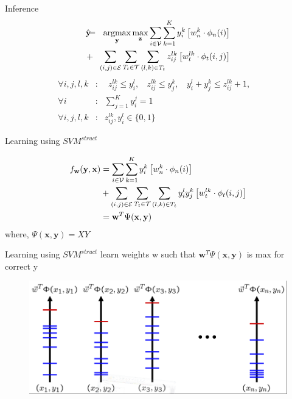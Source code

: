 \documentclass{beamer}
\DeclareMathOperator*{\argmax}{argmax}
\newcommand{\x}{{\mathbf x}}     %
\newcommand{\y}{{\mathbf y}}     %
\newcommand{\ysc}[2]{{y_{#1}^{#2}}}    %
\newcommand{\zsc}[2]{{z_{#1}^{#2}}}    %
\newcommand{\fn}[1]{{\phi_n(#1)}}      %
\newcommand{\fe}[3]{{\phi_{#1}(#2,#3)}}%
\newcommand{\w}{{\mathbf w}}           %
\newcommand{\wn}[1]{{w_n^{#1}}}        %
\newcommand{\we}[3]{{w_{#1}^{#2#3}}}   %
\newcommand{\df}[3]{{f_{#3}(#1,#2)}}   %
\begin{document}
\begin{frame}{Inference}
 \begin{eqnarray*}
\hat{\y}\!\!\!&=&\!\!\!\argmax_{\y}\max_{\mathbf z} \sum_{i \in \mathcal{V}} \sum_{k=1}^{K} \ysc{i}{k} \left[\wn{k} \cdot \fn{i} \right] \\
&+&  \!\!\!\sum_{(i,j)\in \mathcal{E}}  \sum_{T_t \in {\cal T}} \sum_{(l,k)\in T_t} \zsc{ij}{lk} \left[\we{t}{l}{k} \cdot \fe{t}{i}{j}\right] 
 \label{eq:relaxobj}\\
\end{eqnarray*}
 \begin{eqnarray*}
  \forall i,j,l,k &:& \:\: \zsc{ij}{lk}\le \ysc{i}{l}, \:\:\:\:
\zsc{ij}{lk}\le \ysc{j}{k},\:\:\:\:
\ysc{i}{l} + \ysc{j}{k} \le \zsc{ij}{lk}+1,\:\:\:\: \\
\forall i &:& \sum_{j=1}^{K} y_i^j = 1\\
\forall i,j,l,k &:& \zsc{ij}{lk},\ysc{i}{l} \in \{ 0,1 \} \label{eq:relaxconst}
\end{eqnarray*}
\end{frame}

\begin{frame}{Learning using $SVM^{struct}$}

\begin{equation} \label{eq:model}
\begin{split}
\df{\y}{\x}{\w} & = \sum_{i \in \mathcal{V}} \sum_{k=1}^{K} \ysc{i}{k} \left[\wn{k} \cdot \fn{i} \right] \\
 & + \sum_{(i,j)\in \mathcal{E}}   \sum_{T_t \in {\cal T}}  \sum_{(l,k)\in T_t} \ysc{i}{l} \ysc{j}{k}  \left[\we{t}{l}{k} \cdot \fe{t}{i}{j}\right] \\
& = \w^T \Psi(\x,\y)
 \end{split}
\end{equation}
where, $\Psi(\x,\y)=XY$

\end{frame}

\begin{frame}{Learning using $SVM^{struct}$}
learn weights w such that $\w^T \Psi(\x,\y)$  is max for correct y
\begin{figure}[t!]
\includegraphics[width=.9\linewidth]{struct.png}
\end{figure}
\end{frame}
\end{document}
